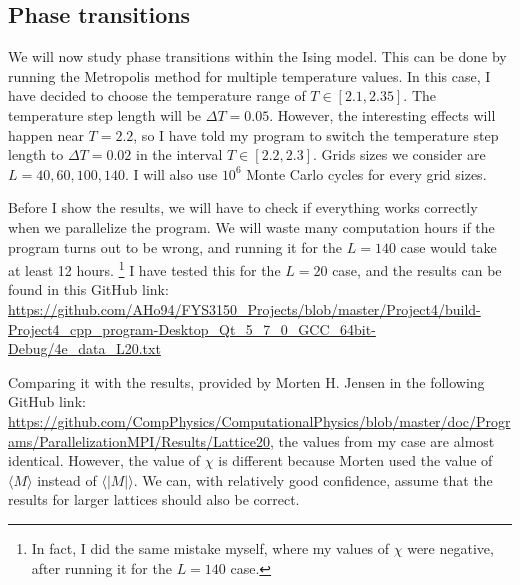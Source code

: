\documentclass[12pt]{article}
\begin{document}
\FloatBarrier
\subsection{Phase transitions}
We will now study phase transitions within the Ising model. This can be done by running the Metropolis method for multiple temperature values. In this case, I have decided to choose the temperature range of $T\in [2.1, 2.35]$. The temperature step length will be $\Delta T = 0.05$. However, the interesting effects will happen near $T=2.2$, so I have told my program to switch the temperature step length to $\Delta T = 0.02$ in the interval $T\in[2.2,2.3]$. Grids sizes we consider are $L=40,60,100,140$. I will also use $10^6$ Monte Carlo cycles for every grid sizes.

Before I show the results, we will have to check if everything works correctly when we parallelize the program. We will waste many computation hours if the program turns out to be wrong, and running it for the $L=140$ case would take at least 12 hours. \footnote{In fact, I did the same mistake myself, where my values of $\chi$ were negative, after running it for the $L=140$ case.} I have tested this for the $L=20$ case, and the results can be found in this GitHub link:
 \url{https://github.com/AHo94/FYS3150_Projects/blob/master/Project4/build-Project4_cpp_program-Desktop_Qt_5_7_0_GCC_64bit-Debug/4e_data_L20.txt}

Comparing it with the results, provided by Morten H. Jensen in the following GitHub link: 
\url{https://github.com/CompPhysics/ComputationalPhysics/blob/master/doc/Programs/ParallelizationMPI/Results/Lattice20}, the values from my case are almost identical. However, the value of $\chi$ is different because Morten used the value of $\langle M \rangle$ instead of $\langle |M| \rangle$. We can, with relatively good confidence, assume that the results for larger lattices should also be correct.
\end{document}
